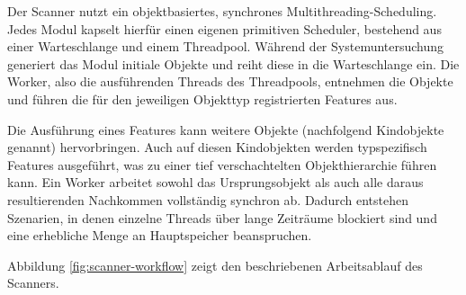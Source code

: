 \begin{sloppypar}
\vspace{7.56mm}

\noindent Der Scanner nutzt ein objektbasiertes, synchrones Multithreading-Scheduling. Jedes Modul kapselt hierfür einen eigenen primitiven Scheduler, bestehend aus einer Warteschlange und einem Threadpool. Während der Systemuntersuchung generiert das Modul initiale Objekte und reiht diese in die Warteschlange ein. Die Worker, also die ausführenden Threads des Threadpools, entnehmen die Objekte und führen die für den jeweiligen Objekttyp registrierten Features aus.

\vspace{7.56mm}

\noindent Die Ausführung eines Features kann weitere Objekte (nachfolgend Kindobjekte genannt) hervorbringen. Auch auf diesen Kindobjekten werden typspezifisch Features ausgeführt, was zu einer tief verschachtelten Objekthierarchie führen kann. 
Ein Worker arbeitet sowohl das Ursprungsobjekt als auch alle
daraus resultierenden Nachkommen vollständig synchron ab.
Dadurch entstehen Szenarien, in denen einzelne Threads über lange Zeiträume blockiert sind und eine erhebliche Menge an Hauptspeicher beanspruchen.


\noindent Abbildung \ref{fig:scanner-workflow} zeigt den beschriebenen Arbeitsablauf des Scanners.

\begin{figure}[H]
\centering
{}
\end{figure}
\end{sloppypar}
